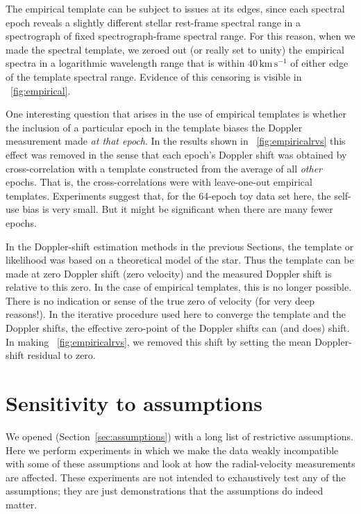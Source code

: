 \documentclass[modern]{aastex631}
\newcommand{\unit}[1]{\mathrm{#1}}
\newcommand{\km}{\unit{km}}
\newcommand{\s}{\unit{s}}
\newcommand{\kmps}{\km\,\s^{-1}}
\newcommand{\sectionname}{Section}
\newcommand{\secref}[1]{\sectionname~\ref{#1}}
\newcommand{\figref}[1]{\figurename~\ref{#1}}
\begin{document}
The empirical template can be subject to issues at its edges, since each spectral epoch reveals a slightly different stellar rest-frame spectral range in a spectrograph of fixed spectrograph-frame spectral range.
For this reason, when we made the spectral template, we zeroed out (or really set to unity) the empirical spectra in a logarithmic wavelength range that is within $40\,\kmps$ of either edge of the template spectral range.
Evidence of this censoring is visible in \figref{fig:empirical}.

One interesting question that arises in the use of empirical templates is whether the inclusion of a particular epoch in the template biases the Doppler measurement made \emph{at that epoch}.
In the results shown in \figref{fig:empiricalrvs} this effect was removed in the sense that each epoch's Doppler shift was obtained by cross-correlation with a template constructed from the average of all \emph{other} epochs.
That is, the cross-correlations were with leave-one-out empirical templates.
Experiments suggest that, for the 64-epoch toy data set here, the self-use bias is very small.
But it might be significant when there are many fewer epochs.

In the Doppler-shift estimation methods in the previous \sectionname s, the template or likelihood was based on a theoretical model of the star.
Thus the template can be made at zero Doppler shift (zero velocity) and the measured Doppler shift is relative to this zero.
In the case of empirical templates, this is no longer possible.
There is no indication or sense of the true zero of velocity (for very deep reasons!).
In the iterative procedure used here to converge the template and the Doppler shifts, the effective zero-point of the Doppler shifts can (and does) shift.
In making \figref{fig:empiricalrvs}, we removed this shift by setting the mean Doppler-shift residual to zero.

\section{Sensitivity to assumptions}\label{sec:sensitivity}

We opened (\secref{sec:assumptions}) with a long list of restrictive assumptions.
Here we perform experiments in which we make the data weakly incompatible with some of these assumptions and look at how the radial-velocity measurements are affected.
These experiments are not intended to exhaustively test any of the assumptions; they are just demonstrations that the assumptions do indeed matter.
\end{document}
